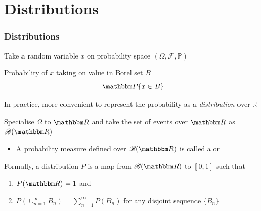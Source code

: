 \section{Distributions}

\begin{frame}\frametitle{Distributions}

    \vspace{2em}
    Take a random variable $x$ on probability space $(\Omega, \mathscr{F}, \mathbb{P})$
    
    Probability of $x$ taking on value in Borel set $B$ 
        $$\PP\{x\in B\}$$
    
    \vspace{1em}
    In practice, more convenient to represent the probability
    as a \emph{distribution} over $\mathbb{R}$ 
    
\end{frame}


\begin{frame}

    \vspace{2em}
    Specialise $\Omega$ to $\RR$ and take the set of 
    events over $\RR$ as $\mathscr{B}(\RR)$
    
    \begin{itemize}
        \item A probability measure defined over $\mathscr{B}(\RR)$
        is called a  or 
    \end{itemize}
    
    \vspace{1em}
    Formally, a distribution
    $P$ is a map from $\bB(\RR)$ to $[0, 1]$ such that 
    \begin{enumerate}
            \label{enum:nu}
        \item $P(\RR) = 1$ and
        \item $P(\cup_{n=1}^{\infty} B_n) = \sum_{n=1}^\infty P(B_n)$ 
            for any disjoint sequence $\{B_n\}$
    \end{enumerate}
    
\end{frame}


